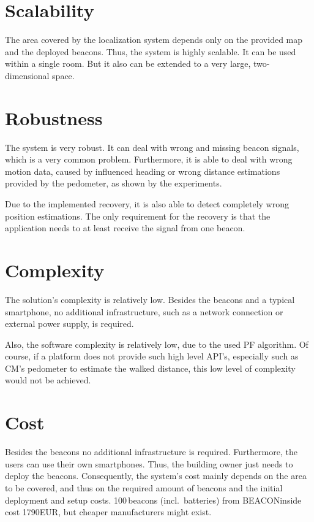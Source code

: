\section{Scalability}
The area covered by the localization system depends only on the provided map and the deployed beacons. Thus, the system is highly scalable. It can be used within a single room. But it also can be extended to a very large, two-dimensional space.

\section{Robustness}
The system is very robust. It can deal with wrong and missing beacon signals, which is a very common problem. Furthermore, it is able to deal with wrong motion data, caused by influenced heading or wrong distance estimations provided by the pedometer, as shown by the experiments.

Due to the implemented recovery, it is also able to detect completely wrong position estimations. The only requirement for the recovery is that the application needs to at least receive the signal from one beacon.

\section{Complexity}
The solution's complexity is relatively low. Besides the beacons and a typical smartphone, no additional infrastructure, such as a network connection or external power supply, is required.
	
Also, the software complexity is relatively low, due to the used \ac{PF} algorithm. Of course, if a platform does not provide such high level \acs{API}'s, especially such as \acl{CM}'s pedometer to estimate the walked distance, this low level of complexity would not be achieved.

\section{Cost}
Besides the beacons no additional infrastructure is required. Furthermore, the users can use their own smartphones. Thus, the building owner just needs to deploy the beacons. Consequently, the system's cost mainly depends on the area to be covered, and thus on the required amount of beacons and the initial deployment and setup costs. 100\,beacons (incl.\ batteries) from BEACONinside cost 1790EUR, but cheaper manufacturers might exist.

